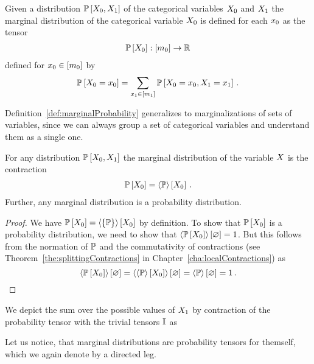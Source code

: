 \begin{definition}\label{def:marginalProbability}
	Given a distribution $\mathbb{P}\left[X_{0},X_{1}\right]$ of the categorical variables $X_{0}$ and $X_{1}$ the marginal distribution of the categorical variable $X_{0}$ is defined for each $x_{0}$ as the tensor
	\begin{align*}
		\mathbb{P}\left[X_{0}\right] : [m_{0}] \rightarrow \mathbb{R}
	\end{align*}
	defined for $x_{0}\in[m_{0}]$ by
	\begin{align*}
		\mathbb{P}\left[X_{0}=x_{0}\right] 
		= \sum_{x_{1}\in[m_{1}]} \mathbb{P}\left[X_{0}=x_{0},X_{1}=x_{1}\right] \, .
	\end{align*}
\end{definition}

Definition~\ref{def:marginalProbability} generalizes to marginalizations of sets of variables, since we can always group a set of categorical variables and understand them as a single one.

\begin{theorem}\label{the:marginalContraction}
	For any distribution $\mathbb{P}\left[X_{0},X_{1}\right]$ the marginal distribution of the variable $X$ is the contraction
	\begin{align*}
		\mathbb{P}\left[X_{0}\right] = \left\langle \mathbb{P}\right\rangle \left[ X_{0} \right] \, .
	\end{align*}
	Further, any marginal distribution is a probability distribution.
\end{theorem}
\begin{proof}
	We have $\mathbb{P}\left[X_{0}\right] = \left\langle \{\mathbb{P}\}\right\rangle \left[ X_{0} \right]$ by definition.
	To show that $\mathbb{P}\left[X_{0}\right]$ is a probability distribution, we need to show that $\left\langle \mathbb{P}\left[X_{0}\right]\right\rangle \left[ \varnothing \right]=1$.
	But this follows from the normation of $\mathbb{P}$ and the commutativity of contractions (see Theorem~\ref{the:splittingContractions} in Chapter~\ref{cha:localContractions}) as
		\[ \left\langle \mathbb{P}\left[X_{0}\right]\right\rangle \left[ \varnothing \right] = 
		\left\langle 
			\left\langle \mathbb{P}\right\rangle \left[ X_{0} \right]
		\right\rangle \left[ \varnothing \right] =
		 \left\langle \mathbb{P}\right\rangle \left[ \varnothing \right]
		= 1 \, . 
		\]
\end{proof}

We depict the sum over the possible values of $X_{1}$ by contraction of the probability tensor with the trivial tensors $\mathbb{I}$ as 
\begin{center}
	
\end{center}
Let us notice, that marginal distributions are probability tensors for themself, which we again denote by a directed leg.


